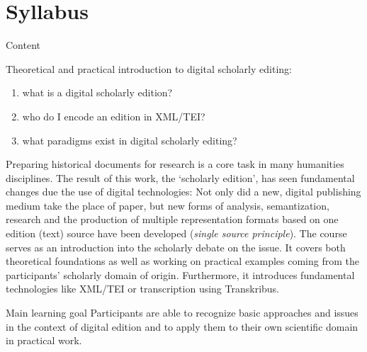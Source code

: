 

\section{Syllabus}
\begin{frame}{Content}
\begin{block}{Theoretical and practical introduction to digital scholarly editing:}

\begin{enumerate}\small
    \item what is a digital scholarly edition?
    \item who do I encode an edition in XML/TEI?
    \item what paradigms exist in digital scholarly editing?
\end{enumerate}
\end{block}

\footnotesize
Preparing historical documents for research is a core task in many humanities disciplines. The result of this work, the `scholarly edition', has seen fundamental changes due the use of digital technologies: Not only did a new, digital publishing medium take the place of paper, but new forms of analysis, semantization, research and the production of multiple representation formats based on one edition (text) source have been developed (\emph{single source principle}). 
The course serves as an introduction into the scholarly debate on the issue. It covers both theoretical foundations as well as working on practical examples coming from the participants' scholarly domain of origin. Furthermore, it introduces fundamental technologies like XML/TEI or transcription using Transkribus.

\begin{block}{Main learning goal}
Participants are able to recognize basic approaches and issues in the context of digital edition and to apply them to their own scientific domain in practical work.
\end{block}

\end{frame}
 
